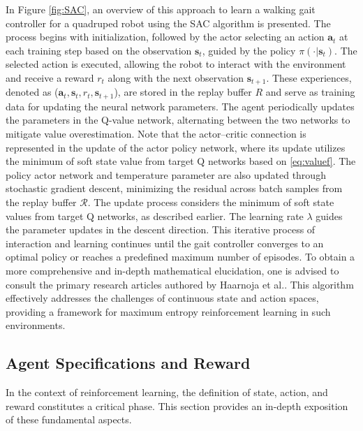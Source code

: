 In Figure \ref{fig:SAC}, an overview of this approach to learn a walking gait controller for a quadruped robot using the SAC algorithm is presented. The process begins with initialization, followed by the actor selecting an action $\mathbf{a}_t$ at each training step based on the observation $\mathbf{s}_t$, guided by the policy $\pi(\cdot|\mathbf{s}_t)$. The selected action is executed, allowing the robot to interact with the environment and receive a reward $r_t$ along with the next observation $\mathbf{s}_{t+1}$. These experiences, denoted as ($\mathbf{a}_t, \mathbf{s}_t, r_t, \mathbf{s}_{t+1}$), are stored in the replay buffer $R$ and serve as training data for updating the neural network parameters. The agent periodically updates the parameters in the Q-value network, alternating between the two networks to mitigate value overestimation. Note that the actor–critic connection is represented in the update of the actor policy network, where its update utilizes the minimum of soft state value from target Q networks based on \ref{eq:valuef}. The policy actor network and temperature parameter are also updated through stochastic gradient descent, minimizing the residual across batch samples from the replay buffer $\mathcal{R}$. The update process considers the minimum of soft state values from target Q networks, as described earlier. The learning rate $\lambda$ guides the parameter updates in the descent direction. This iterative process of interaction and learning continues until the gait controller converges to an optimal policy or reaches a predefined maximum number of episodes. To obtain a more comprehensive and in-depth mathematical elucidation, one is advised to consult the primary research articles authored by Haarnoja et al.\cite{haarnojaSoftActorCriticAlgorithms2019, haarnojaSoftActorCriticOffPolicy2018}. This algorithm effectively addresses the challenges of continuous state and action spaces, providing a framework for maximum entropy reinforcement learning in such environments.

\subsection{Agent Specifications and Reward}
In the context of reinforcement learning, the definition of state, action, and reward constitutes a critical phase. This section provides an in-depth exposition of these fundamental aspects.
